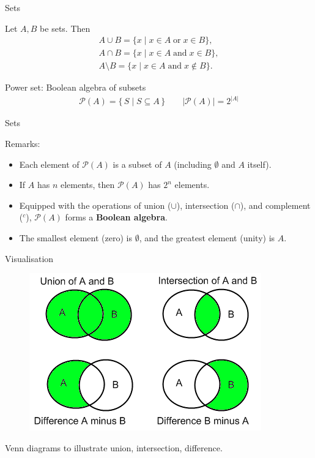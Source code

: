 \begin{frame}{Sets}
\begin{block}{Let \(A, B\) be sets.}
Then\vspace{-0.5cm}
\begin{align*}
A \cup B = \{ x \mid x\in A \;\text{or}\; x\in B\}, \\
A \cap B = \{ x \mid x\in A \;\text{and}\; x\in B\}, \\
A \setminus B = \{ x \mid x\in A \;\text{and}\; x\notin B\}.    
\end{align*}    
\end{block}

\begin{block}{Power set:}
Boolean algebra of subsets
\begin{align*}
\mathcal{P}(A) = \{\, S \mid S \subseteq A \,\}\qquad |\mathcal{P}(A)| = 2^{|A|}
\end{align*}

\end{block}
\end{frame}

\begin{frame}{Sets}
\begin{block}{Remarks:}
\begin{itemize}
  \item Each element of $\mathcal{P}(A)$ is a subset of $A$ (including $\emptyset$ and $A$ itself).
  \item If $A$ has $n$ elements, then $\mathcal{P}(A)$ has $2^n$ elements.
  \item Equipped with the operations of union ($\cup$), intersection ($\cap$), and complement ($^c$), $\mathcal{P}(A)$ forms a \textbf{Boolean algebra}.
  \item The smallest element (zero) is $\emptyset$, and the greatest element (unity) is $A$.
\end{itemize}
\end{block}
\end{frame}

\begin{frame}{Visualisation}
\begin{figure}
    \centering
    \includegraphics[width=0.7\linewidth]{Image2.png}
\end{figure}
Venn diagrams to illustrate union, intersection, difference.
\end{frame}

